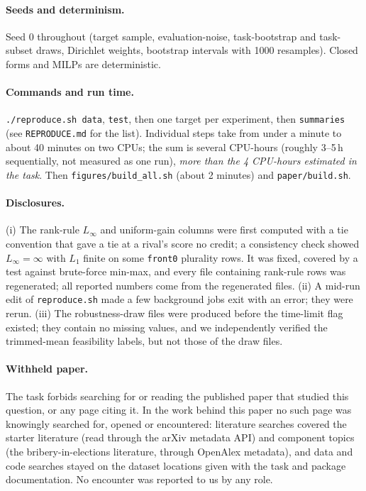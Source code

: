 \paragraph{Seeds and determinism.} Seed 0 throughout (target sample, evaluation-noise, task-bootstrap and task-subset draws, Dirichlet weights, bootstrap intervals with 1000 resamples). Closed forms and MILPs are deterministic.

\paragraph{Commands and run time.} \texttt{./reproduce.sh data}, \texttt{test}, then one target per experiment, then \texttt{summaries} (see \texttt{REPRODUCE.md} for the list). Individual steps take from under a minute to about 40 minutes on two CPUs; the sum is several CPU-hours (roughly 3--5\,h sequentially, not measured as one run), \emph{more than the 4 CPU-hours estimated in the task}. Then \texttt{figures/build\_all.sh} (about 2 minutes) and \texttt{paper/build.sh}.

\paragraph{Disclosures.}
(i) The rank-rule $L_\infty$ and uniform-gain columns were first computed with a tie convention that gave a tie at a rival's score no credit; a consistency check showed $L_\infty=\infty$ with $L_1$ finite on some \texttt{front0} plurality rows. It was fixed, covered by a test against brute-force min-max, and every file containing rank-rule rows was regenerated; all reported numbers come from the regenerated files.
(ii) A mid-run edit of \texttt{reproduce.sh} made a few background jobs exit with an error; they were rerun.
(iii) The robustness-draw files were produced before the time-limit flag existed; they contain no missing values, and we independently verified the trimmed-mean feasibility labels, but not those of the draw files.

\paragraph{Withheld paper.}
The task forbids searching for or reading the published paper that studied this question, or any page citing it. In the work behind this paper no such page was knowingly searched for, opened or encountered: literature searches covered the starter literature (read through the arXiv metadata API) and component topics (the bribery-in-elections literature, through OpenAlex metadata), and data and code searches stayed on the dataset locations given with the task and package documentation. No encounter was reported to us by any role.

